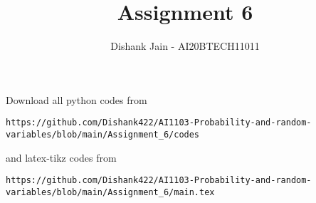 \documentclass[journal,12pt,twocolumn]{IEEEtran}
\DeclareMathOperator*{\Res}{Res}
\begin{document}
\newcommand{\BEQA}{\begin{eqnarray}}
\newcommand{\EEQA}{\end{eqnarray}}
\newcommand{\define}{\stackrel{\triangle}{=}}

\raggedbottom
\setlength{\parindent}{0pt}
\providecommand{\mbf}{\mathbf}
\providecommand{\pr}[1]{\ensuremath{\Pr\left(#1\right)}}
\providecommand{\qfunc}[1]{\ensuremath{Q\left(#1\right)}}
\providecommand{\sbrak}[1]{\ensuremath{{}\left[#1\right]}}
\providecommand{\lsbrak}[1]{\ensuremath{{}\left[#1\right.}}
\providecommand{\rsbrak}[1]{\ensuremath{{}\left.#1\right]}}
\providecommand{\brak}[1]{\ensuremath{\left(#1\right)}}
\providecommand{\lbrak}[1]{\ensuremath{\left(#1\right.}}
\providecommand{\rbrak}[1]{\ensuremath{\left.#1\right)}}
\providecommand{\cbrak}[1]{\ensuremath{\left\{#1\right\}}}
\providecommand{\lcbrak}[1]{\ensuremath{\left\{#1\right.}}
\providecommand{\rcbrak}[1]{\ensuremath{\left.#1\right\}}}
\theoremstyle{remark}
\newtheorem{rem}{Remark}
\newcommand{\sgn}{\mathop{\mathrm{sgn}}}
\providecommand{\abs}[1]{\vert#1\vert}
\providecommand{\res}[1]{\Res\displaylimits_{#1}} 
\providecommand{\norm}[1]{\lVert#1\rVert}
\providecommand{\mtx}[1]{\mathbf{#1}}
\providecommand{\mean}[1]{E[ #1 ]}
\providecommand{\fourier}{\overset{\mathcal{F}}{ \rightleftharpoons}}
\providecommand{\system}{\overset{\mathcal{H}}{ \longleftrightarrow}}
\newcommand{\solution}{\noindent \textbf{Solution: }}
\newcommand{\cosec}{\,\text{cosec}\,}
\providecommand{\dec}[2]{\ensuremath{\overset{#1}{\underset{#2}{\gtrless}}}}
\newcommand{\myvec}[1]{\ensuremath{\begin{pmatrix}#1\end{pmatrix}}}
\newcommand{\mydet}[1]{\ensuremath{\begin{vmatrix}#1\end{vmatrix}}}
\makeatletter
{}
\makeatother
\let\StandardTheFigure\thefigure
\let\vec\mathbf
\renewcommand{\thefigure}{\theproblem}
\def\putbox#1#2#3{\makebox[0in][l]{\makebox[#1][l]{}\raisebox{\baselineskip}[0in][0in]{\raisebox{#2}[0in][0in]{#3}}}}
     \def\rightbox#1{\makebox[0in][r]{#1}}
     \def\centbox#1{\makebox[0in]{#1}}
     \def\topbox#1{\raisebox{-\baselineskip}[0in][0in]{#1}}
     \def\midbox#1{\raisebox{-0.5\baselineskip}[0in][0in]{#1}}
\vspace{3cm}
\title{Assignment 6}
\author{Dishank Jain - AI20BTECH11011}
\maketitle
\newpage
\bigskip
\renewcommand{\thefigure}{\theenumi}
\renewcommand{\thetable}{\theenumi}
Download all python codes from 
\begin{lstlisting}
https://github.com/Dishank422/AI1103-Probability-and-random-variables/blob/main/Assignment_6/codes
\end{lstlisting}
%
and latex-tikz codes from 
%
\begin{lstlisting}
https://github.com/Dishank422/AI1103-Probability-and-random-variables/blob/main/Assignment_6/main.tex
\end{lstlisting}
\end{document}
